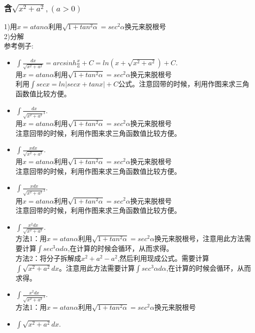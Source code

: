 \documentclass[fleqn]{article}
\begin{document}
\begin{flushleft}
		\subsubsection{含$\sqrt{x^2+a^2},(a>0)$}
		1)用$x=atan\alpha$利用$\sqrt{1+tan^2\alpha}=sec^2\alpha$换元来脱根号\\
		2)分解\\
		参考例子:\\
		\begin{itemize}
			\item $\int \frac{dx}{\sqrt{x^2+a^2}}=arcsinh\frac{x}{a}+C=ln(x+\sqrt{x^2+a^2})+C$.\\
			用$x=atan\alpha$利用$\sqrt{1+tan^2\alpha}=sec^2\alpha$换元来脱根号\\
			利用$\int secx=ln|secx+tanx|+C$公式。注意回带的时候，利用作图来求三角函数值比较方便。
			\item $\int \frac{dx}{\sqrt{x^2+a^2}^3}$.\\
			用$x=atan\alpha$利用$\sqrt{1+tan^2\alpha}=sec^2\alpha$换元来脱根号\\
			注意回带的时候，利用作图来求三角函数值比较方便。
			\item $\int \frac{xdx}{\sqrt{x^2+a^2}}$.\\
			用$x=atan\alpha$利用$\sqrt{1+tan^2\alpha}=sec^2\alpha$换元来脱根号\\
			注意回带的时候，利用作图来求三角函数值比较方便。
			\item $\int \frac{xdx}{\sqrt{x^2+a^2}^3}$.\\
			用$x=atan\alpha$利用$\sqrt{1+tan^2\alpha}=sec^2\alpha$换元来脱根号\\
			注意回带的时候，利用作图来求三角函数值比较方便。
			\item $\int \frac{x^2dx}{\sqrt{x^2+a^2}}$.\\
			方法1：用$x=atan\alpha$利用$\sqrt{1+tan^2\alpha}=sec^2\alpha$换元来脱根号，注意用此方法需要计算$\int sec^3\alpha d\alpha$,在计算的时候会循环，从而求得。\\
			方法2：将分子拆解成$x^2+a^2-a^2$,然后利用现成公式。需要计算$\int \sqrt{x^2+a^2}dx$。注意用此方法需要计算$\int sec^3\alpha d\alpha$,在计算的时候会循环，从而求得。\\
			\item $\int \frac{x^2dx}{\sqrt{x^2+a^2}^3}$.\\
			方法1：用$x=atan\alpha$利用$\sqrt{1+tan^2\alpha}=sec^2\alpha$换元来脱根号\\
			\item $\int \sqrt{x^2+a^2}dx$.\\

\end{itemize}
\end{flushleft}
\end{document}
